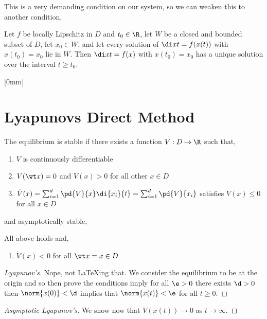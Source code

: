 This is a very demanding condition on our system, so we can weaken this to another condition,

\begin{ndefi}
  Let $f$ be locally Lipschitz in $D$ and $t_0 \in \R$, let $W$ be a closed and bounded subset of $D$, let $x_0 \in W$, and let every solution of $\di x t = f(x(t))$ with $x(t_0) = x_0$ lie in $W$. Then $\di x t = f(x)$ with $x(t_0) = x_0$ has a unique solution over the interval $t \ge t_0$.
\end{ndefi}

[0mm]
\section{Lyapunovs Direct Method}
\begin{nthm}[]
  The equilibrium is stable if there exists a function $V : D \mapsto \R$ such that,
  \begin{enumerate}
    \item $V$ is continuously differentiable
    \item $V(\wt x) = 0$ and $V(x) > 0$ for all other $x \in D$
    \item $\dot V(x) = \sum_{i=1}^d \pd{V}{x}\di{x_i}{t} = \sum_{i=1}^d \pd{V}{x_i}$ satisfies $\dot V (x) \le 0$ for all $x \in D$
  \end{enumerate}
\end{nthm}
and asymptotically stable,
\begin{nthm}[]
  All above holds and,
  \begin{enumerate}
    \item $\dot V(x) < 0$ for all $\wt x = x \in D$
  \end{enumerate}
\end{nthm}

\begin{proof}[Lyapunov's]
  Nope, not LaTeXing that. We consider the equilibrium to be at the origin and so then prove the conditions imply for all $\e > 0$ there exists $\d > 0$ then $\norm{x(0)} < \d$ implies that $\norm{x(t)} < \e$ for all $t \ge 0$.
\end{proof}

\begin{proof}[Asymptotic Lyapunov's]
  We show now that $V(x(t)) \to 0$ as $t \to \infty$.
\end{proof}
